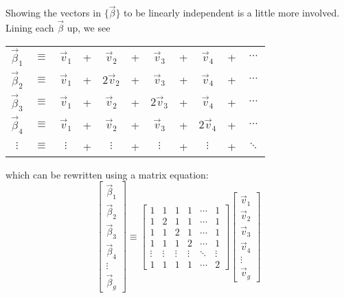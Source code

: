 \documentclass[a4paper, reqno, 12pt]{amsart}
\begin{document}
		Showing the vectors in $\{\vec{\beta}\}$ to be linearly independent is a little more involved. Lining each $\vec{\beta}$ up, we see
		\begin{center}
			\begin{tabular}{*{11}{c}}
				$\vec{\beta}_1$ & $\equiv$ & $\vec{v}_1$ & + & $\vec{v}_2$  & + & $\vec{v}_3$  & + & $\vec{v}_4$  & + & $\cdots$ \\
				$\vec{\beta}_2$ & $\equiv$ & $\vec{v}_1$ & + & $2\vec{v}_2$ & + & $\vec{v}_3$  & + & $\vec{v}_4$  & + & $\cdots$ \\
				$\vec{\beta}_3$ & $\equiv$ & $\vec{v}_1$ & + & $\vec{v}_2$  & + & $2\vec{v}_3$ & + & $\vec{v}_4$  & + & $\cdots$ \\
				$\vec{\beta}_4$ & $\equiv$ & $\vec{v}_1$ & + & $\vec{v}_2$  & + & $\vec{v}_3$  & + & $2\vec{v}_4$ & + & $\cdots$ \\
				$\vdots$        & $\equiv$ & $\vdots$    & + & $\vdots$     & + & $\vdots$     & + & $\vdots$     & + & $\ddots$
			\end{tabular}
		\end{center}
		which can be rewritten using a matrix equation:
		\[
			\begin{bmatrix}
				\vec{\beta}_1 \\
				\vec{\beta}_2 \\
				\vec{\beta}_3 \\
				\vec{\beta}_4 \\
				\vdots        \\
				\vec{\beta}_g
			\end{bmatrix}
			\equiv
			\begin{bmatrix}
				1      & 1      & 1      & 1      & \cdots & 1      \\
				1      & 2      & 1      & 1      & \cdots & 1      \\
				1      & 1      & 2      & 1      & \cdots & 1      \\
				1      & 1      & 1      & 2      & \cdots & 1      \\
				\vdots & \vdots & \vdots & \vdots & \ddots & \vdots \\
				1      & 1      & 1      & 1      & \cdots & 2
			\end{bmatrix}
			\begin{bmatrix}
				\vec{v}_1 \\
				\vec{v}_2 \\
				\vec{v}_3 \\
				\vec{v}_4 \\
				\vdots    \\
				\vec{v}_g
			\end{bmatrix}
		\]
\end{document}
